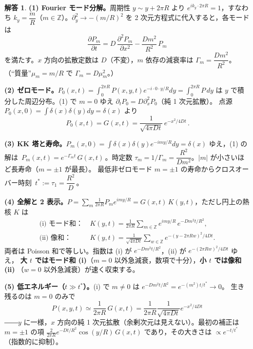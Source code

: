 \documentclass[dvipdfmx, uplatex]{jsarticle}
\theoremstyle{definition}
\newtheorem*{sol}{解答}
\begin{document}
\begin{sol}
\textbf{(1) Fourier モード分解。}周期性 $y\sim y+2\pi R$ より $e^{ik_y\cdot2\pi R}=1$，すなわち
$\boxed{k_y=\dfrac{m}{R}}$（$m\in\mathbb{Z}$）。$\partial_y^2\to-(m/R)^2$ を 2 次元方程式に代入すると，各モードは
\[
    \boxed{\,\frac{\partial P_m}{\partial t}=D\,\frac{\partial^2 P_m}{\partial x^2}-\frac{Dm^2}{R^2}\,P_m\,}
\]
を満たす。$x$ 方向の拡散定数は $\boxed{D}$（不変），$m$ 依存の減衰率は $\boxed{\Gamma_m=\dfrac{Dm^2}{R^2}}$。
（``質量''$\mu_m=m/R$ で $\Gamma_m=D\mu_m^2$。）

\par\smallskip
\textbf{(2) ゼロモード。}$P_0(x,t)=\int_0^{2\pi R}P(x,y,t)e^{-i\cdot0\cdot y/R}dy=\int_0^{2\pi R}P\,dy$ は
$y$ で積分した周辺分布。(1) で $m=0$ ゆえ $\boxed{\partial_tP_0=D\partial_x^2P_0}$（純 1 次元拡散）。
点源 $P_0(x,0)=\int\delta(x)\delta(y)dy=\delta(x)$ より
\[
    \boxed{\,P_0(x,t)=G(x,t)=\frac{1}{\sqrt{4\pi Dt}}\,e^{-x^2/4Dt}\,}.
\]

\par\smallskip
\textbf{(3) KK 塔と寿命。}$P_m(x,0)=\int\delta(x)\delta(y)e^{-imy/R}dy=\delta(x)$ ゆえ，(1) の解は
$\boxed{\,P_m(x,t)=e^{-\Gamma_m t}\,G(x,t)\,}$。時定数
$\boxed{\tau_m=1/\Gamma_m=\dfrac{R^2}{Dm^2}}$。$|m|$ が小さいほど長寿命（$m=\pm1$ が最長）。
最低非ゼロモード $m=\pm1$ の寿命からクロスオーバー時刻
$\boxed{\,t^\ast:=\tau_1=\dfrac{R^2}{D}\,}$。

\par\smallskip
\textbf{(4) 全解と 2 表示。}$P=\sum_m\frac{1}{2\pi R}P_m e^{imy/R}=G(x,t)\,K(y,t)$，ただし円上の熱核 $K$ は
\begin{align*}
    \text{(i) モード和：}&\ \boxed{K(y,t)=\frac{1}{2\pi R}\sum_{m\in\mathbb{Z}}e^{imy/R}\,e^{-Dm^2t/R^2}},\\
    \text{(ii) 像和：}&\ \boxed{K(y,t)=\frac{1}{\sqrt{4\pi Dt}}\sum_{w\in\mathbb{Z}}e^{-(y-2\pi Rw)^2/4Dt}}.
\end{align*}
両者は Poisson 和で等しい。指数は (i) が $e^{-Dm^2t/R^2}$，(ii) が $e^{-(2\pi Rw)^2/4Dt}$ ゆえ，
\textbf{大 $t$ ではモード和 (i)}（$m=0$ 以外急減衰，数項で十分），\textbf{小 $t$ では像和 (ii)}
（$w=0$ 以外急減衰）が速く収束する。

\par\smallskip
\textbf{(5) 低エネルギー（$t\gg t^\ast$）。}(i) で $m\neq0$ は $e^{-Dm^2t/R^2}=e^{-(m^2)t/t^\ast}\to0$。
生き残るのは $\boxed{m=0}$ のみで
\[
    \boxed{\,P(x,y,t)\simeq\frac{1}{2\pi R}\,G(x,t)=\frac{1}{2\pi R}\frac{1}{\sqrt{4\pi Dt}}e^{-x^2/4Dt}\,}
\]
――$y$ に一様，$x$ 方向の純 1 次元拡散（余剰次元は見えない）。最初の補正は $m=\pm1$ の項
$\frac{2}{2\pi R}e^{-Dt/R^2}\cos(y/R)\,G(x,t)$ であり，その大きさは $\boxed{\propto e^{-t/t^\ast}}$
（指数的に抑制）。


\end{sol}
\end{document}
